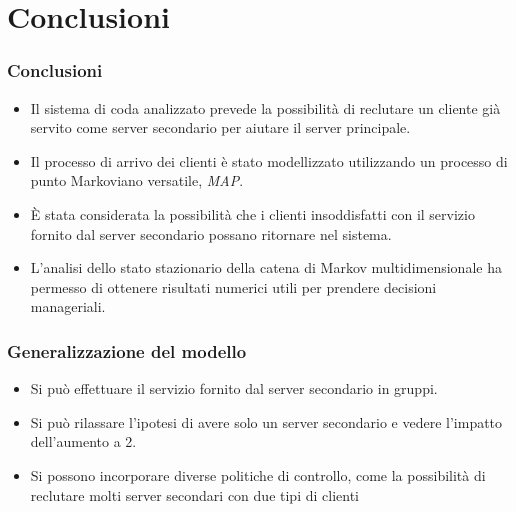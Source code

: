 \documentclass{beamer}
\begin{document}
\section{Conclusioni}

\begin{frame}
    \frametitle{Conclusioni}
    \begin{itemize}
        \item Il sistema di coda analizzato prevede la possibilità di reclutare un cliente già servito come server secondario per aiutare il server principale.
        \item Il processo di arrivo dei clienti è stato modellizzato utilizzando un processo di punto Markoviano versatile, \emph{MAP}.
        \item È stata considerata la possibilità che i clienti insoddisfatti con il servizio fornito dal server secondario possano ritornare nel sistema.
        \item L'analisi dello stato stazionario della catena di Markov multidimensionale ha permesso di ottenere risultati numerici utili per prendere decisioni manageriali.
    \end{itemize}
\end{frame}


\begin{frame}
    \frametitle{Generalizzazione del modello}
    \begin{itemize}
        \item Si può effettuare il servizio fornito dal server secondario in gruppi.
        \item Si può rilassare l'ipotesi di avere solo un server secondario e vedere l'impatto dell'aumento a 2.
        \item Si possono incorporare diverse politiche di controllo, come la possibilità di reclutare molti server secondari con due tipi di clienti
    \end{itemize}
\end{frame}
\end{document}
